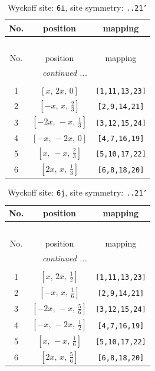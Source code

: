 \documentclass[fleqn,8pt]{jsarticle}
\begin{document}
\renewcommand{\arraystretch}{1.2}
\begin{longtable}{ccc}
\caption{Wyckoff site: {\tt 6i}, site symmetry: {\tt ..21'}}
 \\
 \hline \hline
No. & position & mapping \\ \hline \endfirsthead

\multicolumn{2}{l}{\tablename\ \thetable{}} \\
 \hline \hline
No. & position & mapping \\ \hline \endhead

 \hline \hline
\multicolumn{2}{r}{\footnotesize\it continued ...} \\ \endfoot

 \hline \hline
\multicolumn{2}{r}{} \\ \endlastfoot

1 & $\left[ x,\, 2 x,\, 0 \right]$ & {\tt [1,11,13,23]} \\ \hline
2 & $\left[ - x,\, x,\, \frac{2}{3} \right]$ & {\tt [2,9,14,21]} \\ \hline
3 & $\left[ - 2 x,\, - x,\, \frac{1}{3} \right]$ & {\tt [3,12,15,24]} \\ \hline
4 & $\left[ - x,\, - 2 x,\, 0 \right]$ & {\tt [4,7,16,19]} \\ \hline
5 & $\left[ x,\, - x,\, \frac{2}{3} \right]$ & {\tt [5,10,17,22]} \\ \hline
6 & $\left[ 2 x,\, x,\, \frac{1}{3} \right]$ & {\tt [6,8,18,20]} \\
\end{longtable}
\renewcommand{\arraystretch}{1.2}
\begin{longtable}{ccc}
\caption{Wyckoff site: {\tt 6j}, site symmetry: {\tt ..21'}}
 \\
 \hline \hline
No. & position & mapping \\ \hline \endfirsthead

\multicolumn{2}{l}{\tablename\ \thetable{}} \\
 \hline \hline
No. & position & mapping \\ \hline \endhead

 \hline \hline
\multicolumn{2}{r}{\footnotesize\it continued ...} \\ \endfoot

 \hline \hline
\multicolumn{2}{r}{} \\ \endlastfoot

1 & $\left[ x,\, 2 x,\, \frac{1}{2} \right]$ & {\tt [1,11,13,23]} \\ \hline
2 & $\left[ - x,\, x,\, \frac{1}{6} \right]$ & {\tt [2,9,14,21]} \\ \hline
3 & $\left[ - 2 x,\, - x,\, \frac{5}{6} \right]$ & {\tt [3,12,15,24]} \\ \hline
4 & $\left[ - x,\, - 2 x,\, \frac{1}{2} \right]$ & {\tt [4,7,16,19]} \\ \hline
5 & $\left[ x,\, - x,\, \frac{1}{6} \right]$ & {\tt [5,10,17,22]} \\ \hline
6 & $\left[ 2 x,\, x,\, \frac{5}{6} \right]$ & {\tt [6,8,18,20]} \\
\end{longtable}
\end{document}
